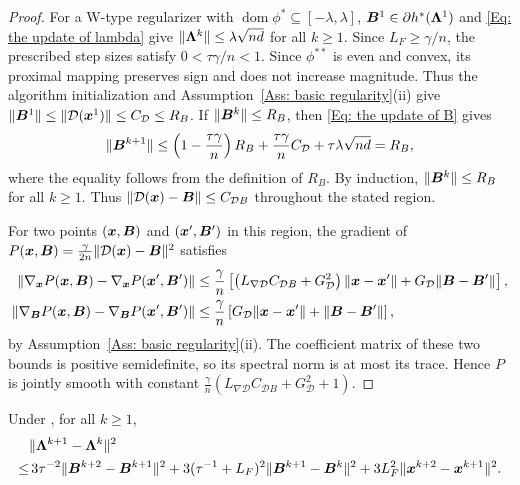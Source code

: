 \begin{proof}
For a W-type regularizer with $\operatorname{dom}\phi^*\subseteq[-\lambda,\lambda]$, $\bm{B}^1\in\partial h^*(\bm{\Lambda}^1)$ and \eqref{Eq: the update of lambda} give $\|\bm{\Lambda}^k\|\le\lambda\sqrt{nd}$ for all $k\ge1$.
Since $L_F\ge\gamma/n$, the prescribed step sizes satisfy $0<\tau\gamma/n<1$.
Since $\phi^{**}$ is even and convex, its proximal mapping preserves sign and does not increase magnitude. Thus the algorithm initialization and Assumption~\ref{Ass: basic regularity}(ii) give $\|\bm{B}^1\|\le\|\mathcal{D}(\bm{x}^1)\|\le C_{\mathcal{D}}\le R_B$. If $\|\bm{B}^k\|\le R_B$, then \eqref{Eq: the update of B} gives
\[
\|\bm{B}^{k+1}\|\le\left(1-\frac{\tau\gamma}{n}\right)R_B
+\frac{\tau\gamma}{n}C_{\mathcal{D}}+\tau\lambda\sqrt{nd}=R_B,
\]
where the equality follows from the definition of $R_B$. By induction, $\|\bm{B}^k\|\le R_B$ for all $k\ge1$.
Thus $\|\mathcal{D}(\bm{x})-\bm{B}\|\le C_{\mathcal{D}B}$ throughout the stated region.

For two points $(\bm{x},\bm{B})$ and $(\bm{x}',\bm{B}')$ in this region, the gradient of $P(\bm{x},\bm{B})=\frac{\gamma}{2n}\|\mathcal{D}(\bm{x})-\bm{B}\|^2$ satisfies
\begin{align*}
\|\nabla_{\bm{x}}P(\bm{x},\bm{B})-\nabla_{\bm{x}}P(\bm{x}',\bm{B}')\|
&\le\frac{\gamma}{n}\left[\left(L_{\nabla\mathcal{D}}C_{\mathcal{D}B}+G_{\mathcal{D}}^2\right)\|\bm{x}-\bm{x}'\|+G_{\mathcal{D}}\|\bm{B}-\bm{B}'\|\right],\\
\|\nabla_{\bm{B}}P(\bm{x},\bm{B})-\nabla_{\bm{B}}P(\bm{x}',\bm{B}')\|
&\le\frac{\gamma}{n}\left[G_{\mathcal{D}}\|\bm{x}-\bm{x}'\|+\|\bm{B}-\bm{B}'\|\right],
\end{align*}
by Assumption~\ref{Ass: basic regularity}(ii).
The coefficient matrix of these two bounds is positive semidefinite, so its spectral norm is at most its trace.
Hence $P$ is jointly smooth with constant $\frac{\gamma}{n}(L_{\nabla\mathcal{D}}C_{\mathcal{D}B}+G_{\mathcal{D}}^2+1)$.
\end{proof}

\endgroup

\begin{lemma}
\label{app:dual-difference-proof}
\label{Lemma: dual boundedness}
Under , for all $k \geq 1$,
    \begin{align}
        &\|\bm{\Lambda}^{k+1}- \bm{\Lambda}^k \|^2 \notag \\
        \leq&\,3 \tau^{-2} \|\bB^{k+2} - \bB^{k+1}\|^2 + 3(\tau^{-1} + L_F)^2  \|\bB^{k+1} - \bB^{k}\|^2 + 3L_F^2  \|\bx^{k+2} - \bx^{k+1}\|^2.
         \label{Eq: dual boundedness}
\end{align}
\end{lemma}


